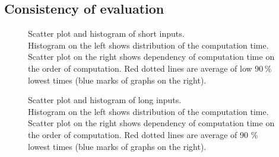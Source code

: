 \subsection{Consistency of evaluation}\label{sec:consistency}

\begin{figure}[p]%
    \hfill
    \caption{Scatter plot and histogram of short inputs.\\
    Histogram on the left shows distribution of the computation time.
    Scatter plot on the right shows dependency of computation time on the order of computation.
    Red dotted lines are average of low 90\,\% lowest times (blue marks of graphs on the right).
    }%
    \label{fig:multiple_small}
    \vspace{2em}

    \hfill
    \caption{Scatter plot and histogram of long inputs.\\
    Histogram on the left shows distribution of the computation time.
    Scatter plot on the right shows dependency of computation time on the order of computation.
    Red dotted lines are average of 90 \% lowest times (blue marks of graphs on the right).
    }%
    \label{fig:multiple_long}
\end{figure}


